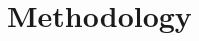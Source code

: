 \doublespacing %

\chapter{Methodology}
\label{ch2}

\begin{spacing}{1} %
\minitoc %
\end{spacing} %
\thesisspacing %



% 


% 


% 
